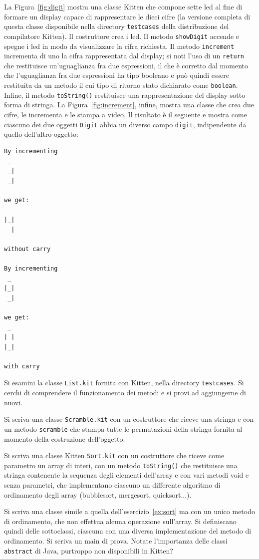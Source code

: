 La Figura~\ref{fig:digit} mostra una classe Kitten che compone sette
led al fine di formare un display capace di rappresentare le dieci cifre
(la versione completa di questa classe \e disponibile nella directory
\texttt{testcases} della distribuzione del compilatore Kitten).
Il costruttore crea i led. Il metodo \texttt{showDigit} accende e spegne
i led in modo da visualizzare la cifra richiesta. Il metodo
\texttt{increment} incrementa di uno la cifra rappresentata dal display;
si noti l'uso di un \texttt{return} che restituisce un'uguaglianza fra
due espressioni, il che \`e corretto dal momento che l'uguaglianza fra due
espressioni ha tipo booleano e pu\`o quindi essere restituita da un metodo
il cui tipo di ritorno \e stato dichiarato come \texttt{boolean}.
Infine, il metodo \texttt{toString()} restituisce una rappresentazione del
display sotto forma di stringa.
La Figura~\ref{fig:increment}, infine, mostra una classe che crea
due cifre, le incrementa e le stampa a video. Il risultato \`e il seguente
e mostra come ciascuno dei due oggetti \texttt{Digit} abbia un diverso
campo \texttt{digit}, indipendente da quello dell'altro oggetto:
%
\begin{verbatim}
By incrementing
 _
 _|
 _|

we get:

|_|
  |

without carry

By incrementing
 _
|_|
 _|

we get:
 _
| |
|_|

with carry
\end{verbatim}
%
\clearpage
%
\begin{exercise}\label{ex:list}
Si esamini la classe \texttt{List.kit} fornita con Kitten, nella
directory \texttt{testcases}. Si cerchi di comprendere il funzionamento
dei metodi e si provi ad aggiungerne di nuovi.
\end{exercise}
%
\begin{exercise}\label{ex:scramble}
Si scriva una classe \texttt{Scramble.kit} con un costruttore che riceve
una stringa e con un metodo \texttt{scramble} che stampa tutte le permutazioni
della stringa fornita al momento della costruzione dell'oggetto.
\end{exercise}
%
\begin{exercise}\label{ex:sort}
Si scriva una classe Kitten \texttt{Sort.kit} con un costruttore che
riceve come parametro un array di interi, con un metodo \texttt{toString()} che
restituisce una stringa contenente la sequenza degli elementi
dell'array e con vari metodi void e senza parametri,
che implementano ciascuno un differente algoritmo di ordinamento degli array
(bubblesort, mergesort, quicksort...).
\end{exercise}
%
\begin{exercise}\label{ex:sort2}
Si scriva una classe simile a quella dell'esercizio~\ref{ex:sort} ma
con un unico metodo di ordinamento, che non effettua alcuna operazione
sull'array. Si definiscano quindi delle sottoclassi, ciascuna
con una diversa implementazione del metodo di ordinamento. Si scriva un
main di prova. Notate l'importanza delle classi \texttt{abstract} di Java,
purtroppo non disponibili in Kitten?
\end{exercise}

